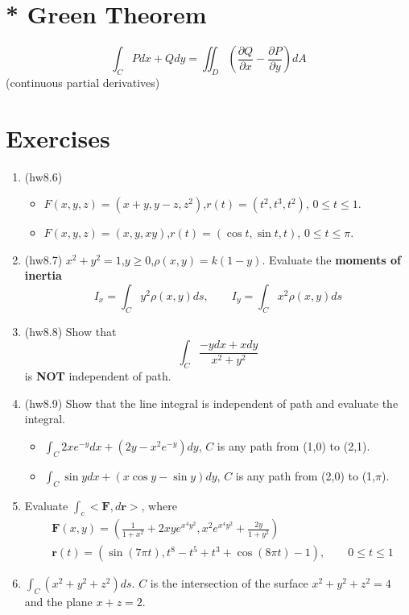 \documentclass{article}
\begin{document}
\section{* Green Theorem}
    \begin{equation*}
        \int_C Pdx+Qdy = \iint_D (\frac{\partial{Q}}{\partial{x}}-\frac{\partial{P}}{\partial{y}})dA
    \end{equation*}
    (continuous partial derivatives)
     \vspace{0.5pt}

\section{Exercises}
    \begin{enumerate}
        \item (hw8.6)
            \begin{itemize}
                \item $F(x,y,z)=(x+y,y-z,z^2)$,$r(t)=(t^2,t^3,t^2)$, $0\leq t\leq 1$.
                 \item $F(x,y,z)=(x,y,xy)$,$r(t)=(\cos{t},\sin{t},t)$, $0\leq t\leq \pi$.
            \end{itemize}
        \item (hw8.7) $x^2+y^2=1$,$y\geq 0$,$\rho(x,y)=k(1-y)$. Evaluate the \textbf{moments of inertia}
            \begin{equation*}
                I_x=\int_Cy^2\rho(x,y)ds, \qquad I_y=\int_Cx^2\rho(x,y)ds
            \end{equation*}        
        \item (hw8.8) Show that 
            \begin{equation*}
                \int_C \frac{-ydx+xdy}{x^2+y^2} 
            \end{equation*}
            is \textbf{NOT} independent of path.
        \item (hw8.9) Show that the line integral is independent of path and evaluate the integral.
            \begin{itemize}
                \item $\int_C2xe^{-y}dx+(2y-x^2e^{-y})dy$, $C$ is any path from (1,0) to (2,1).\\
                \item $\int_C\sin{y}dx+(x\cos{y}-\sin{y})dy$, $C$ is any path from (2,0) to (1,$\pi$).\\
            \end{itemize}
        \item Evaluate $\int_c<\boldsymbol{F},d\boldsymbol{r}>$, where
        \begin{align*}
            &\boldsymbol{F}(x,y)=(\frac{1}{1+x^2}+2xye^{x^4y^2},x^2e^{x^4y^2}+\frac{2y}{1+y^2})\\
            &\boldsymbol{r}(t)=(\sin(7\pi t),t^8-t^5+t^3+\cos{(8\pi t)}-1),\qquad 0\leq t\leq 1
        \end{align*}
         \item $\int_C (x^2+y^2+z^2)ds$. $C$ is the intersection of the surface $x^2+y^2+z^2=4$ and the plane $x+z=2$.
    \end{enumerate}
      
\end{document}
